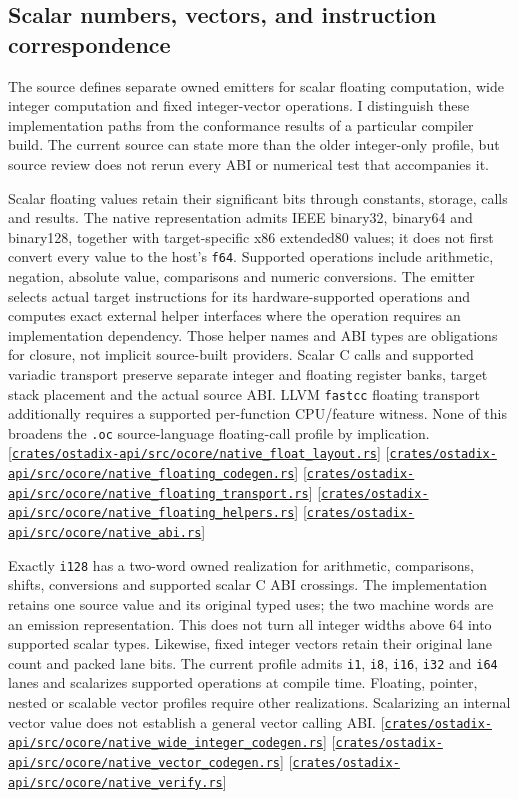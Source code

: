 \documentclass[11pt,oneside]{article}
\newcommand{\src}[1]{\textcolor{OSlate}{\scriptsize[\href{https://github.com/lostadi/OSTADIX/blob/c0b02c326b2329a95ba52447c7180bc93957cd57/#1}{\nolinkurl{#1}}]}\allowbreak}
\begin{document}
\subsection{Scalar numbers, vectors, and instruction correspondence}

The source defines separate owned emitters for scalar floating computation,
wide integer computation and fixed integer-vector operations. I distinguish
these implementation paths from the conformance results of a particular
compiler build. The current source can state more than the older
integer-only profile, but source review does not rerun every ABI or numerical
test that accompanies it.

Scalar floating values retain their significant bits through constants,
storage, calls and results. The native representation admits IEEE binary32,
binary64 and binary128, together with target-specific x86 extended80 values;
it does not first convert every value to the host's \texttt{f64}. Supported
operations include arithmetic, negation, absolute value, comparisons and
numeric conversions. The emitter selects actual target instructions for its
hardware-supported operations and computes exact external helper interfaces
where the operation requires an implementation dependency. Those helper
names and ABI types are obligations for closure, not implicit source-built
providers. Scalar C calls and supported variadic transport preserve separate
integer and floating register banks, target stack placement and the actual
source ABI. LLVM \texttt{fastcc} floating transport additionally requires a
supported per-function CPU/feature witness. None of this broadens the
\texttt{.oc} source-language floating-call profile by implication.
\src{crates/ostadix-api/src/ocore/native_float_layout.rs}
\src{crates/ostadix-api/src/ocore/native_floating_codegen.rs}
\src{crates/ostadix-api/src/ocore/native_floating_transport.rs}
\src{crates/ostadix-api/src/ocore/native_floating_helpers.rs}
\src{crates/ostadix-api/src/ocore/native_abi.rs}

Exactly \texttt{i128} has a two-word owned realization for arithmetic,
comparisons, shifts, conversions and supported scalar C ABI crossings.
The implementation retains one source value and its original typed uses;
the two machine words are an emission representation. This does not turn
all integer widths above 64 into supported scalar types. Likewise, fixed
integer vectors retain their original lane count and packed lane bits.
The current profile admits \texttt{i1}, \texttt{i8}, \texttt{i16},
\texttt{i32} and \texttt{i64} lanes and scalarizes supported operations at
compile time. Floating, pointer, nested or scalable vector profiles require
other realizations. Scalarizing an internal vector value does not establish
a general vector calling ABI.
\src{crates/ostadix-api/src/ocore/native_wide_integer_codegen.rs}
\src{crates/ostadix-api/src/ocore/native_vector_codegen.rs}
\src{crates/ostadix-api/src/ocore/native_verify.rs}
\end{document}
